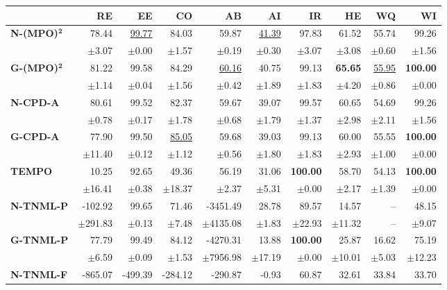 \begin{table}[!htbp]
\centering
\scriptsize
\begin{tabular}{lrrrrr||rrrr}
\toprule
 & RE & EE & CO & AB & AI & IR & HE & WQ & WI \\
\midrule
\textbf{N-(MPO)}$\bm{^2}$ & 78.44 & \underline{99.77} & 84.03 & 59.87 & \underline{41.39} & 97.83 & 61.52 & 55.74 & 99.26 \\
 & $\pm$3.07 & $\pm$0.00 & $\pm$1.57 & $\pm$0.19 & $\pm$0.30 & $\pm$3.07 & $\pm$3.08 & $\pm$0.60 & $\pm$1.56 \\
\midrule
\textbf{G-(MPO)}$\bm{^2}$ & 81.22 & 99.58 & 84.29 & \underline{60.16} & 40.75 & 99.13 & \textbf{65.65} & \underline{55.95} & \textbf{100.00} \\
 & $\pm$1.14 & $\pm$0.04 & $\pm$1.56 & $\pm$0.42 & $\pm$1.89 & $\pm$1.83 & $\pm$4.20 & $\pm$0.86 & $\pm$0.00 \\
\midrule
\textbf{N-CPD-A} & 80.61 & 99.52 & 82.37 & 59.67 & 39.07 & 99.57 & 60.65 & 54.69 & 99.26 \\
 & $\pm$0.78 & $\pm$0.17 & $\pm$1.78 & $\pm$0.68 & $\pm$1.79 & $\pm$1.37 & $\pm$2.98 & $\pm$2.11 & $\pm$1.56 \\
\midrule
\textbf{G-CPD-A} & 77.90 & 99.50 & \underline{85.05} & 59.68 & 39.03 & 99.13 & 60.00 & 55.55 & \textbf{100.00} \\
 & $\pm$11.40 & $\pm$0.12 & $\pm$1.12 & $\pm$0.56 & $\pm$1.80 & $\pm$1.83 & $\pm$2.93 & $\pm$1.00 & $\pm$0.00 \\
\midrule
\textbf{TEMPO} & 10.25 & 92.65 & 49.36 & 56.19 & 31.06 & \textbf{100.00} & 58.70 & 54.13 & \textbf{100.00} \\
 & $\pm$16.41 & $\pm$0.38 & $\pm$18.37 & $\pm$2.37 & $\pm$5.31 & $\pm$0.00 & $\pm$2.17 & $\pm$1.39 & $\pm$0.00 \\
\midrule
\textbf{N-TNML-P} & -102.92 & 99.65 & 71.46 & -3451.49 & 28.78 & 89.57 & 14.57 & -- & 48.15 \\
 & $\pm$291.83 & $\pm$0.13 & $\pm$7.48 & $\pm$4135.08 & $\pm$1.83 & $\pm$22.93 & $\pm$11.32 & -- & $\pm$9.07 \\
\midrule
\textbf{G-TNML-P} & 77.79 & 99.49 & 84.12 & -4270.31 & 13.88 & \textbf{100.00} & 25.87 & 16.62 & 75.19 \\
 & $\pm$6.59 & $\pm$0.09 & $\pm$1.53 & $\pm$7956.98 & $\pm$17.19 & $\pm$0.00 & $\pm$10.01 & $\pm$5.03 & $\pm$12.23 \\
\midrule
\textbf{N-TNML-F} & -865.07 & -499.39 & -284.12 & -290.87 & -0.93 & 60.87 & 32.61 & 33.84 & 33.70 \\

\end{tabular}
\end{table}
